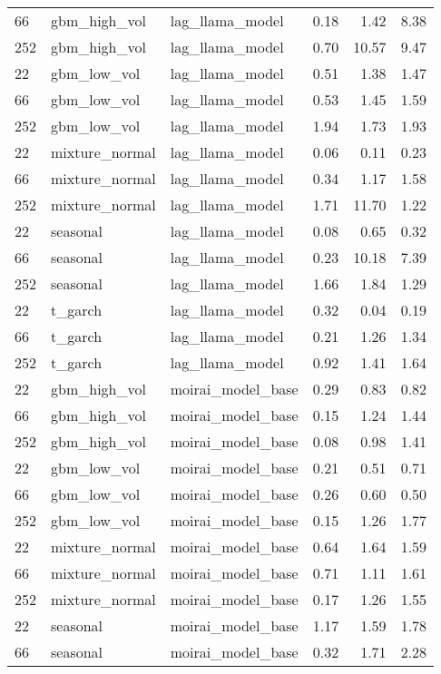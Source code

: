 {\begin{tabular}{lllrrr}
66 & gbm\_high\_vol & lag\_llama\_model & 0.18 & 1.42 & 8.38 \\
252 & gbm\_high\_vol & lag\_llama\_model & 0.70 & 10.57 & 9.47 \\
\midrule
22 & gbm\_low\_vol & lag\_llama\_model & 0.51 & 1.38 & 1.47 \\
66 & gbm\_low\_vol & lag\_llama\_model & 0.53 & 1.45 & 1.59 \\
252 & gbm\_low\_vol & lag\_llama\_model & 1.94 & 1.73 & 1.93 \\
\midrule
22 & mixture\_normal & lag\_llama\_model & 0.06 & 0.11 & 0.23 \\
66 & mixture\_normal & lag\_llama\_model & 0.34 & 1.17 & 1.58 \\
252 & mixture\_normal & lag\_llama\_model & 1.71 & 11.70 & 1.22 \\
\midrule
22 & seasonal & lag\_llama\_model & 0.08 & 0.65 & 0.32 \\
66 & seasonal & lag\_llama\_model & 0.23 & 10.18 & 7.39 \\
252 & seasonal & lag\_llama\_model & 1.66 & 1.84 & 1.29 \\
\midrule
22 & t\_garch & lag\_llama\_model & 0.32 & 0.04 & 0.19 \\
66 & t\_garch & lag\_llama\_model & 0.21 & 1.26 & 1.34 \\
252 & t\_garch & lag\_llama\_model & 0.92 & 1.41 & 1.64 \\
\midrule
22 & gbm\_high\_vol & moirai\_model\_base & 0.29 & 0.83 & 0.82 \\
66 & gbm\_high\_vol & moirai\_model\_base & 0.15 & 1.24 & 1.44 \\
252 & gbm\_high\_vol & moirai\_model\_base & 0.08 & 0.98 & 1.41 \\
\midrule
22 & gbm\_low\_vol & moirai\_model\_base & 0.21 & 0.51 & 0.71 \\
66 & gbm\_low\_vol & moirai\_model\_base & 0.26 & 0.60 & 0.50 \\
252 & gbm\_low\_vol & moirai\_model\_base & 0.15 & 1.26 & 1.77 \\
\midrule
22 & mixture\_normal & moirai\_model\_base & 0.64 & 1.64 & 1.59 \\
66 & mixture\_normal & moirai\_model\_base & 0.71 & 1.11 & 1.61 \\
252 & mixture\_normal & moirai\_model\_base & 0.17 & 1.26 & 1.55 \\
\midrule
22 & seasonal & moirai\_model\_base & 1.17 & 1.59 & 1.78 \\
66 & seasonal & moirai\_model\_base & 0.32 & 1.71 & 2.28 \\

\end{tabular}}
